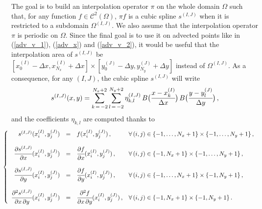 \documentclass[10pt]{article}
\newcommand{\D}{{\partial}}
\newcommand{\Cl}{{\mathcal C}}
\begin{document}
\indent The goal is to build an interpolation operator $\pi$ on the whole domain $\Omega$ such that, for any function $f \in \Cl^{2}(\Omega)$, $\pi f$ is a cubic spline $s^{(I,J)}$ when it is restricted to a subdomain $\Omega^{(I,J)}$. We also assume that the interpolation operator $\pi$ is periodic on $\Omega$. Since the final goal is to use it on advected points like in (\ref{adv_v_1}), (\ref{adv_x}) and (\ref{adv_v_2}), it would be useful that the interpolation area of $s^{(I,J)}$ be $[x_{0}^{(I)}-\Delta x, x_{N_{x}}^{(I)}+\Delta x] \times [y_{0}^{(J)}-\Delta y, y_{N_{y}}^{(J)}+\Delta y]$ instead of $\Omega^{(I,J)}$. As a consequence, for any $(I,J)$, the cubic spline $s^{(I,J)}$ will write
\begin{equation}
s^{(I,J)}(x,y) = \sum_{k\,=\,-2}^{N_{x}+2} \sum_{l\,=\,-2}^{N_{y}+2} \eta_{k,l}^{(I,J)}\,B\big(\cfrac{x-x_{k}^{(I)}}{\Delta x}\big) \, B\big(\cfrac{y-y_{l}^{(J)}}{\Delta y}\big) \, ,
\end{equation}
and the coefficients $\eta_{k,l}$ are computed thanks to
\begin{equation}
\hspace{-0.5cm} \left\{
\begin{array}{rcll}
s^{(I,J)}(x_{i}^{(I)},y_{j}^{(J)}) &=& f(x_{i}^{(I)},y_{j}^{(J)}) \, , & \forall\, (i,j) \in \{-1,\dots,N_{x}+1\} \times \{-1,\dots,N_{y}+1\} \, , \\ \\
\cfrac{\D s^{(I,J)}}{\D x}(x_{i}^{(I)},y_{j}^{(J)}) &=& \cfrac{\D f}{\D x}(x_{i}^{(I)},y_{j}^{(J)}) \, , & \forall\, (i,j) \in \{ -1,N_{x}+1\} \times \{-1,\dots,N_{y}+1\} \, , \\ \\
\cfrac{\D s^{(I,J)}}{\D y}(x_{i}^{(I)},y_{j}^{(J)}) &=& \cfrac{\D f}{\D y}(x_{i}^{(I)},y_{j}^{(J)}) \, , & \forall\, (i,j) \in \{ -1,\dots,N_{x}+1\} \times \{-1,N_{y}+1\} \, , \\ \\
\cfrac{\D^{2}s^{(I,J)}}{\D x\,\D y}(x_{i}^{(I)},y_{j}^{(J)}) &=& \cfrac{\D^{2}f}{\D x\,\D y}(x_{i}^{(I)},y_{j}^{(J)}) \, , & \forall\, (i,j) \in \{ -1,N_{x}+1\} \times \{ -1,N_{y}+1\} \, .
\end{array}
\right.
\end{equation}

\textit{ \\ }
\end{document}
